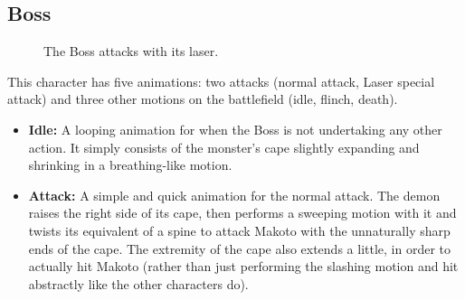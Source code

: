 \subsection{Boss}

\begin{figure}
    \centering
    \caption{The Boss attacks with its laser.}
    \label{fig:laser}
\end{figure}

This character has five animations: two attacks (normal attack, Laser special attack) and three other motions on the battlefield (idle, flinch, death).

\begin{itemize}
    \item \textbf{Idle:} A looping animation for when the Boss is not undertaking any other action. It simply consists of the monster's cape slightly expanding and shrinking in a breathing-like motion.
    
    \item \textbf{Attack:} A simple and quick animation for the normal attack. The demon raises the right side of its cape, then performs a sweeping motion with it and twists its equivalent of a spine to attack Makoto with the unnaturally sharp ends of the cape. The extremity of the cape also extends a little, in order to actually hit Makoto (rather than just performing the slashing motion and hit abstractly like the other characters do).
\end{itemize}

